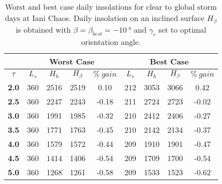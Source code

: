 \begin{table}[h]
\footnotesize
\centering
\caption[Worst and best case daily insolations for global storm days at Iani Chaos]
{Worst and best case daily insolations for clear to global storm days at Iani Chaos. Daily insolation on an inclined surface $H_{\beta}$ is obtained with $\beta = \beta_{best} = \SI{-10}{\degree}$ and $\gamma_{c}$ set to optimal orientation angle.}
\label{tab:insolation-iani-chaos-global-storm-days}
\begin{tabular}{c|c|c|c|c|c|c|c|c|}
\cline{2-9}
\multicolumn{1}{l|}{} & \multicolumn{4}{c|}{\textbf{Worst Case}} & \multicolumn{4}{c|}{\textbf{Best Case}} \\ \hline
\multicolumn{1}{|c|}{$\tau$} & $L_{s}$ & $H_{h}$ & $H_{\beta}$ & $\%\:gain$ & $L_{s}$ & $H_{h}$ & $H_{\beta}$ & $\%\:gain$ \\ \hline
\multicolumn{1}{|c|}{\textbf{2.0}} & 360 & 2516 & 2519 & 0.10 & 212 & 3053 & 3066 & 0.42 \\ \hline
\multicolumn{1}{|c|}{\textbf{2.5}} & 360 & 2247 & 2243 & -0.18 & 211 & 2724 & 2723 & -0.02 \\ \hline
\multicolumn{1}{|c|}{\textbf{3.0}} & 360 & 1991 & 1985 & -0.32 & 210 & 2412 & 2406 & -0.27 \\ \hline
\multicolumn{1}{|c|}{\textbf{3.5}} & 360 & 1771 & 1763 & -0.45 & 210 & 2142 & 2134 & -0.37 \\ \hline
\multicolumn{1}{|c|}{\textbf{4.0}} & 360 & 1579 & 1572 & -0.44 & 209 & 1910 & 1901 & -0.47 \\ \hline
\multicolumn{1}{|c|}{\textbf{4.5}} & 360 & 1414 & 1406 & -0.54 & 209 & 1709 & 1700 & -0.54 \\ \hline
\multicolumn{1}{|c|}{\textbf{5.0}} & 360 & 1268 & 1261 & -0.58 & 209 & 1533 & 1523 & -0.62 \\ \hline
\end{tabular}
\end{table}
